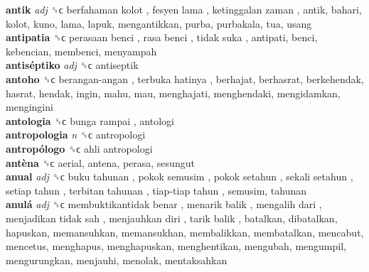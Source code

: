 \textbf{antik} \emph{adj}  ␝ϲ   berfahaman kolot ,  fesyen lama ,  ketinggalan zaman , antik, bahari, kolot, kuno, lama, lapuk, mengantikkan, purba, purbakala, tua, usang  \\
\textbf{antipatia} ␝ϲ   perasaan benci ,  rasa benci ,  tidak suka , antipati, benci, kebencian, membenci, menyampah  \\
\textbf{antiséptiko} \emph{adj}  ␝ϲ  antiseptik  \\
\textbf{antoho} ␝ϲ   berangan-angan ,  terbuka hatinya , berhajat, berhasrat, berkehendak, hasrat, hendak, ingin, mahu, mau, menghajati, menghendaki, mengidamkan, mengingini  \\
\textbf{antologia} ␝ϲ   bunga rampai , antologi  \\
\textbf{antropologia} \emph{n}  ␝ϲ  antropologi  \\
\textbf{antropólogo} ␝ϲ   ahli antropologi   \\
\textbf{antèna} ␝ϲ  aerial, antena, perasa, sesungut  \\
\textbf{anual} \emph{adj}  ␝ϲ   buku tahunan ,  pokok semusim ,  pokok setahun ,  sekali setahun ,  setiap tahun ,  terbitan tahunan ,  tiap-tiap tahun , semusim, tahunan  \\
\textbf{anulá} \emph{adj}  ␝ϲ   membuktikantidak benar ,  menarik balik ,  mengalih dari ,  menjadikan tidak sah ,  menjauhkan diri ,  tarik balik , batalkan, dibatalkan, hapuskan, memansuhkan, memansukhan, membalikkan, membatalkan, mencabut, mencetus, menghapus, menghapuskan, menghentikan, mengubah, mengumpil, mengurungkan, menjauhi, menolak, mentaksahkan  \\
